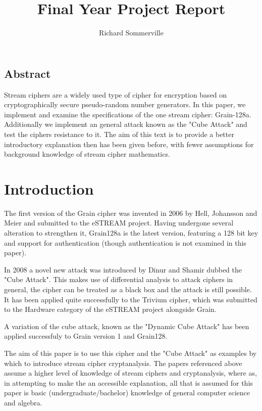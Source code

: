 \documentclass{report}
\title{Final Year Project Report}
\author{Richard Sommerville}
\date{}
\begin{document}
\maketitle
\tableofcontents
\section{Abstract}
Stream ciphers are a widely used type of cipher for encryption based on cryptographically secure pseudo-random number generators. In this paper, we  implement and examine the specifications of the one stream cipher: Grain-128a.
Additionally we implement an general attack known as the "Cube Attack" and test the ciphers resistance to it.
The aim of this text is to provide a better introductory explanation then has been given before, with fewer assumptions for background knowledge of stream cipher mathematics.
\chapter{Introduction}
The first version of the Grain cipher was invented in 2006 by Hell, Johansson and Meier \cite{Grain128aSpec} and submitted to the eSTREAM project. Having undergone several alteration to strengthen it, Grain128a is the latest version, featuring a 128 bit key and support for authentication (though authentication is not examined in this paper).

In 2008 a novel new attack was introduced by Dinur and Shamir\cite{DinurShamir2009} dubbed the "Cube Attack". This makes use of differential analysis to attack ciphers in general, the cipher can be treated as a black box and the attack is still possible. It has been applied quite successfully to the Trivium cipher, which was submitted to the Hardware category of the eSTREAM project alongside Grain\cite{Grain128aSpec}.

A variation of the cube attack, known as the "Dynamic Cube Attack" has been applied successfuly to Grain version 1 and Grain128.

The aim of this paper is to use this cipher and the "Cube Attack" as examples by which to introduce stream cipher cryptanalysis. The papers referenced above assume a higher level of knowledge of stream ciphers and cryptanalysis, where as, in attempting to make the an accessible explanation, all that is assumed for this paper is basic (undergraduate/bachelor) knowledge of general computer science and algebra.
\end{document}
